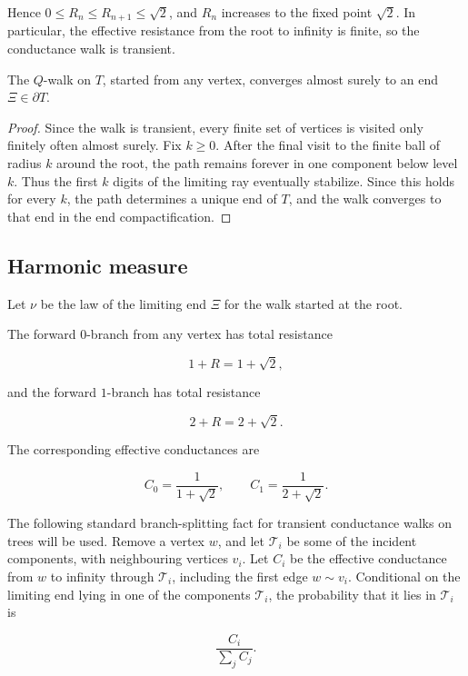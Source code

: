 \documentclass[11pt,a4paper]{scrartcl}
\begin{document}
Hence \(0\le R_n\le R_{n+1}\le\sqrt2\), and \(R_n\) increases to the fixed
point \(\sqrt2\). In particular, the effective resistance from the root to
infinity is finite, so the conductance walk is transient.

\begin{proposition}\label{prop:tree-convergence}
The \(Q\)-walk on \(T\), started from any vertex,
converges almost surely to an end \(\Xi\in\partial T\).

\end{proposition}
\begin{proof}
Since the walk is transient, every finite set of vertices is visited
only finitely often almost surely. Fix \(k\ge 0\). After the final visit to
the finite ball of radius \(k\) around the root, the path remains forever in
one component below level \(k\). Thus the first \(k\) digits of the limiting
ray eventually stabilize. Since this holds for every \(k\), the path
determines a unique end of \(T\), and the walk converges to that end in the end
compactification.
\end{proof}


\subsection{Harmonic measure}\label{subsec:harmonic-measure}


Let \(\nu\) be the law of the limiting end \(\Xi\) for the walk started at the
root.

The forward \(0\)-branch from any vertex has total resistance

\[
1+R=1+\sqrt2,
\]

and the forward \(1\)-branch has total resistance

\[
2+R=2+\sqrt2.
\]

The corresponding effective conductances are

\[
C_0=\frac1{1+\sqrt2},
\qquad
C_1=\frac1{2+\sqrt2}.
\]

The following standard branch-splitting fact for transient conductance walks on
trees will be used. Remove a vertex \(w\), and let \(\mathcal T_i\) be some of
the incident components, with neighbouring vertices \(v_i\). Let \(C_i\) be the
effective conductance from \(w\) to infinity through \(\mathcal T_i\), including
the first edge \(w\sim v_i\). Conditional on the limiting end lying in one of
the components \(\mathcal T_i\), the probability that it lies in
\(\mathcal T_i\) is

\[
\frac{C_i}{\sum_j C_j}.
\]
\end{document}

